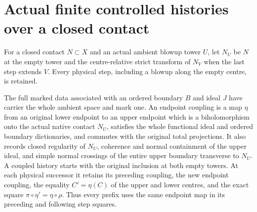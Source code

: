 \section{Actual finite controlled histories over a closed contact}

\begin{definition}
\label{hir:disjoint-finite-contact-along}
\leanok
For a closed contact $N\subset X$ and an actual ambient blowup tower $U$, let
$N_U$ be $N$ at the empty tower and the centre-relative strict transform of
$N_V$ when the last step extends $V$. Every physical step, including a blowup
along the empty centre, is retained.
\end{definition}

\begin{definition}
\label{hir:disjoint-finite-coupling}
\leanok
The full marked data associated with an ordered boundary $B$ and ideal $J$
have carrier the whole ambient space and mark one. An endpoint coupling is a
map $\eta$ from an original lower endpoint to an upper endpoint which is a
biholomorphism onto the actual native contact $N_U$, satisfies the whole
functional ideal and ordered boundary dictionaries, and commutes with the
original total projections. It also records closed regularity of $N_U$,
coherence and normal containment of the upper ideal, and simple normal
crossings of the entire upper boundary transverse to $N_U$.
A coupled history starts with the original inclusion at both empty towers.
At each physical successor it retains its preceding coupling, the new
endpoint coupling, the equality $C'=\eta(C)$ of the upper and lower centres,
and the exact square $\pi\circ\eta'=\eta\circ\rho$. Thus every prefix uses
the same endpoint map in its preceding and following step squares.
\end{definition}

